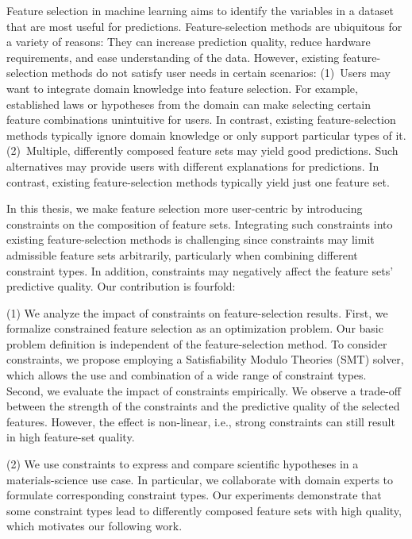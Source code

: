 Feature selection in machine learning aims to identify the variables in a dataset that are most useful for predictions.
Feature-selection methods are ubiquitous for a variety of reasons:
They can increase prediction quality, reduce hardware requirements, and ease understanding of the data.
However, existing feature-selection methods do not satisfy user needs in certain scenarios:
(1)~Users may want to integrate domain knowledge into feature selection.
For example, established laws or hypotheses from the domain can make selecting certain feature combinations unintuitive for users.
In contrast, existing feature-selection methods typically ignore domain knowledge or only support particular types of it.
(2)~Multiple, differently composed feature sets may yield good predictions.
Such alternatives may provide users with different explanations for predictions.
In contrast, existing feature-selection methods typically yield just one feature set.

In this thesis, we make feature selection more user-centric by introducing constraints on the composition of feature sets.
Integrating such constraints into existing feature-selection methods is challenging since constraints may limit admissible feature sets arbitrarily, particularly when combining different constraint types.
In addition, constraints may negatively affect the feature sets' predictive quality.
Our contribution is fourfold:

(1) We analyze the impact of constraints on feature-selection results.
First, we formalize constrained feature selection as an optimization problem.
Our basic problem definition is independent of the feature-selection method.
To consider constraints, we propose employing a Satisfiability Modulo Theories (SMT) solver, which allows the use and combination of a wide range of constraint types.
Second, we evaluate the impact of constraints empirically.
We observe a trade-off between the strength of the constraints and the predictive quality of the selected features.
However, the effect is non-linear, i.e., strong constraints can still result in high feature-set quality.

(2) We use constraints to express and compare scientific hypotheses in a materials-science use case.
In particular, we collaborate with domain experts to formulate corresponding constraint types.
Our experiments demonstrate that some constraint types lead to differently composed feature sets with high quality, which motivates our following work.

